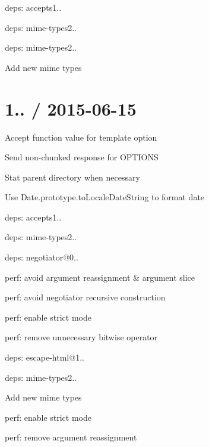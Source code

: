 \begin{DoxyItemize}
\item deps\+: accepts1..
\begin{DoxyItemize}
\item deps\+: mime-\/types2..
\end{DoxyItemize}
\item deps\+: mime-\/types2..
\begin{DoxyItemize}
\item Add new mime types
\end{DoxyItemize}
\end{DoxyItemize}

\section*{1.. / 2015-\/06-\/15 }


\begin{DoxyItemize}
\item Accept {\ttfamily function} value for {\ttfamily template} option
\item Send non-\/chunked response for {\ttfamily O\+P\+T\+I\+O\+NS}
\item Stat parent directory when necessary
\item Use {\ttfamily Date.\+prototype.\+to\+Locale\+Date\+String} to format date
\item deps\+: accepts1..
\begin{DoxyItemize}
\item deps\+: mime-\/types2..
\item deps\+: negotiator@0..
\item perf\+: avoid argument reassignment \& argument slice
\item perf\+: avoid negotiator recursive construction
\item perf\+: enable strict mode
\item perf\+: remove unnecessary bitwise operator
\end{DoxyItemize}
\item deps\+: escape-\/html@1..
\item deps\+: mime-\/types2..
\begin{DoxyItemize}
\item Add new mime types
\end{DoxyItemize}
\item perf\+: enable strict mode
\item perf\+: remove argument reassignment
\end{DoxyItemize}

